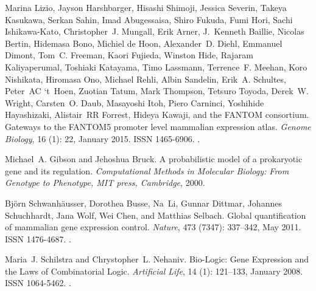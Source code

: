 \documentclass[10pt, a4paper]{article}
\begin{document}
\begin{thebibliography}{59}
	Marina Lizio, Jayson Harshbarger, Hisashi Shimoji, Jessica Severin, Takeya
	Kasukawa, Serkan Sahin, Imad Abugessaisa, Shiro Fukuda, Fumi Hori, Sachi
	{Ishikawa-Kato}, Christopher~J. Mungall, Erik Arner, J.~Kenneth Baillie,
	Nicolas Bertin, Hidemasa Bono, Michiel {de Hoon}, Alexander~D. Diehl,
	Emmanuel Dimont, Tom~C. Freeman, Kaori Fujieda, Winston Hide, Rajaram
	Kaliyaperumal, Toshiaki Katayama, Timo Lassmann, Terrence~F. Meehan, Koro
	Nishikata, Hiromasa Ono, Michael Rehli, Albin Sandelin, Erik~A. Schultes,
	Peter~AC `t~Hoen, Zuotian Tatum, Mark Thompson, Tetsuro Toyoda, Derek~W.
	Wright, Carsten~O. Daub, Masayoshi Itoh, Piero Carninci, Yoshihide
	Hayashizaki, Alistair~RR Forrest, Hideya Kawaji, and {the FANTOM consortium}.
	\newblock Gateways to the {{FANTOM5}} promoter level mammalian expression
	atlas.
	\newblock \emph{Genome Biology}, 16 (1): 22, January 2015.
	\newblock ISSN 1465-6906.
	\newblock {}.
	
	Michael~A. Gibson and Jehoshua Bruck.
	\newblock A probabilistic model of a prokaryotic gene and its regulation.
	\newblock \emph{Computational Methods in Molecular Biology: From Genotype to
		Phenotype, MIT press, Cambridge}, 2000.
	
	Bj{\"o}rn Schwanh{\"a}usser, Dorothea Busse, Na~Li, Gunnar Dittmar, Johannes
	Schuchhardt, Jana Wolf, Wei Chen, and Matthias Selbach.
	\newblock Global quantification of mammalian gene expression control.
	\newblock \emph{Nature}, 473 (7347): 337--342, May 2011.
	\newblock ISSN 1476-4687.
	\newblock {}.
	
	Maria~J. Schilstra and Chrystopher~L. Nehaniv.
	\newblock Bio-{{Logic}}: {{Gene Expression}} and the {{Laws}} of
	{{Combinatorial Logic}}.
	\newblock \emph{Artificial Life}, 14 (1): 121--133, January
	2008.
	\newblock ISSN 1064-5462.
	\newblock {}.
	

\end{thebibliography}
\end{document}
